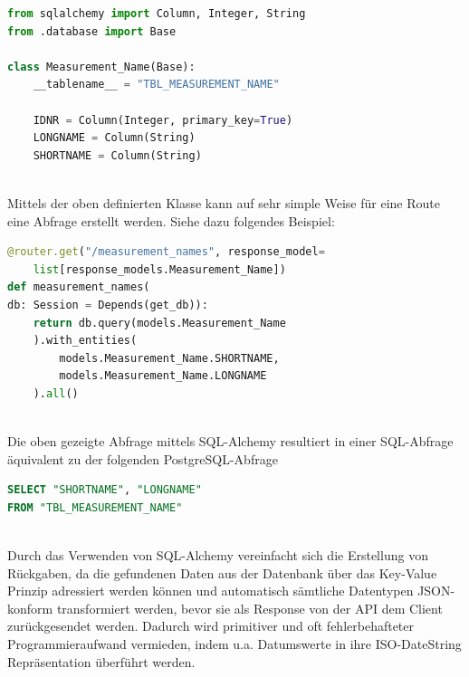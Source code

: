\begin{lstlisting}[language={Python}, caption={Anbindung an die Datenbank}, captionpos=b, label={fig:pythonDBModels}]
from sqlalchemy import Column, Integer, String
from .database import Base

class Measurement_Name(Base):
    __tablename__ = "TBL_MEASUREMENT_NAME"
    
    IDNR = Column(Integer, primary_key=True)
    LONGNAME = Column(String)
    SHORTNAME = Column(String)
\end{lstlisting}~\\
Mittels der oben definierten Klasse kann auf sehr simple Weise für eine Route eine 
Abfrage erstellt werden. Siehe dazu folgendes Beispiel: ~\\

\begin{lstlisting}[language={Python}, caption={Anbindung an die Datenbank}, captionpos=b, label={fig:SQL-ALchemy Query}]
@router.get("/measurement_names", response_model=
    list[response_models.Measurement_Name])
def measurement_names(
db: Session = Depends(get_db)):
    return db.query(models.Measurement_Name
    ).with_entities(
        models.Measurement_Name.SHORTNAME,
        models.Measurement_Name.LONGNAME
    ).all()
\end{lstlisting}~\\
Die oben gezeigte Abfrage mittels SQL-Alchemy resultiert in einer SQL-Abfrage 
äquivalent zu der folgenden PostgreSQL-Abfrage~\\

\begin{lstlisting}[language={SQL}, caption={Äquivalente SQL Abfrage}, captionpos=b, label={fig:pythonDBModels}]
SELECT "SHORTNAME", "LONGNAME"
FROM "TBL_MEASUREMENT_NAME"
\end{lstlisting}~\\ 
Durch das Verwenden von SQL-Alchemy vereinfacht sich die Erstellung von Rückgaben, 
da die gefundenen Daten aus der Datenbank über das Key-Value Prinzip adressiert werden können 
und automatisch sämtliche Datentypen JSON-konform transformiert werden, bevor sie als 
Response von der API dem Client zurückgesendet werden. Dadurch wird primitiver und 
oft fehlerbehafteter Programmieraufwand vermieden, indem u.a. Datumswerte in ihre 
ISO-DateString \cite{iso-datestring} Repräsentation überführt werden.

